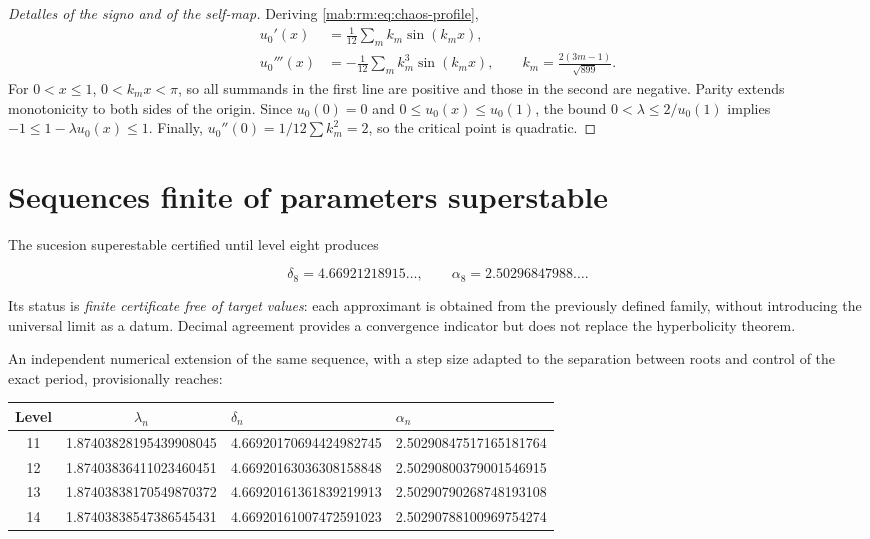\begin{proof}[Detalles of the signo and of the self-map]
Deriving \cref{mab:rm:eq:chaos-profile},
\begin{align*}
u_0'(x)&=\frac1{12}\sum_m k_m\sin(k_mx),\\
u_0'''(x)&=-\frac1{12}\sum_m k_m^3\sin(k_mx),
\qquad k_m=\frac{2(3m-1)}{\sqrt{899}}.
\end{align*}
For \(0<x\le1\), \(0<k_mx<\pi\), so all summands in the first
line are positive and those in the second are negative. Parity extends
monotonicity to both sides of the origin. Since \(u_0(0)=0\) and
\(0\le u_0(x)\le u_0(1)\), the bound
\(0<\lambda\le2/u_0(1)\) implies
\(-1\le1-\lambda u_0(x)\le1\). Finally,
\(u_0''(0)=1/12\sum k_m^2=2\), so the critical point is
quadratic.
\end{proof}

\section{Sequences finite of parameters superstable}

The sucesion superestable certified until level eight produces

\[
\delta_8=4.66921218915\ldots,
\qquad
\alpha_8=2.50296847988\ldots.
\]

Its status is \emph{finite certificate free of target values}: each
approximant is obtained from the previously defined family, without introducing
the universal limit as a datum. Decimal agreement provides a
convergence indicator but does not replace the hyperbolicity theorem.

An independent numerical extension of the same sequence, with a step size
adapted to the separation between roots and control of the exact period,
provisionally reaches:

\begin{center}
\small
\begin{tabular}{@{}ccll@{}}
\toprule
Level & \(\lambda_n\) & \(\delta_n\) & \(\alpha_n\)\\
\midrule
11 & 1.87403828195439908045 & 4.66920170694424982745 & 2.50290847517165181764\\
12 & 1.87403836411023460451 & 4.66920163036308158848 & 2.50290800379001546915\\
13 & 1.87403838170549870372 & 4.66920161361839219913 & 2.50290790268748193108\\
14 & 1.87403838547386545431 & 4.66920161007472591023 & 2.50290788100969754274\\
\bottomrule
\end{tabular}
\end{center}

